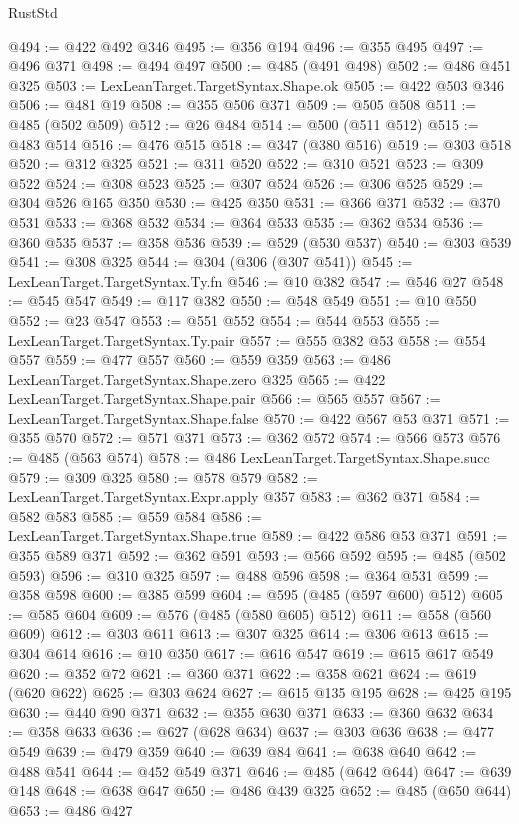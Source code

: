 \begin{lexlean}{RustStd}
\begin{coremodule}
@494 := @422 @492 @346
@495 := @356 @194
@496 := @355 @495
@497 := @496 @371
@498 := @494 @497
@500 := @485 (@491 @498)
@502 := @486 @451 @325
@503 := LexLeanTarget.TargetSyntax.Shape.ok
@505 := @422 @503 @346
@506 := @481 @19
@508 := @355 @506 @371
@509 := @505 @508
@511 := @485 (@502 @509)
@512 := @26 @484
@514 := @500 (@511 @512)
@515 := @483 @514
@516 := @476 @515
@518 := @347 (@380 @516)
@519 := @303 @518
@520 := @312 @325
@521 := @311 @520
@522 := @310 @521
@523 := @309 @522
@524 := @308 @523
@525 := @307 @524
@526 := @306 @525
@529 := @304 @526 @165 @350
@530 := @425 @350
@531 := @366 @371
@532 := @370 @531
@533 := @368 @532
@534 := @364 @533
@535 := @362 @534
@536 := @360 @535
@537 := @358 @536
@539 := @529 (@530 @537)
@540 := @303 @539
@541 := @308 @325
@544 := @304 (@306 (@307 @541))
@545 := LexLeanTarget.TargetSyntax.Ty.fn
@546 := @10 @382
@547 := @546 @27
@548 := @545 @547
@549 := @117 @382
@550 := @548 @549
@551 := @10 @550
@552 := @23 @547
@553 := @551 @552
@554 := @544 @553
@555 := LexLeanTarget.TargetSyntax.Ty.pair
@557 := @555 @382 @53
@558 := @554 @557
@559 := @477 @557
@560 := @559 @359
@563 := @486 LexLeanTarget.TargetSyntax.Shape.zero @325
@565 := @422 LexLeanTarget.TargetSyntax.Shape.pair
@566 := @565 @557
@567 := LexLeanTarget.TargetSyntax.Shape.false
@570 := @422 @567 @53 @371
@571 := @355 @570
@572 := @571 @371
@573 := @362 @572
@574 := @566 @573
@576 := @485 (@563 @574)
@578 := @486 LexLeanTarget.TargetSyntax.Shape.succ
@579 := @309 @325
@580 := @578 @579
@582 := LexLeanTarget.TargetSyntax.Expr.apply @357
@583 := @362 @371
@584 := @582 @583
@585 := @559 @584
@586 := LexLeanTarget.TargetSyntax.Shape.true
@589 := @422 @586 @53 @371
@591 := @355 @589 @371
@592 := @362 @591
@593 := @566 @592
@595 := @485 (@502 @593)
@596 := @310 @325
@597 := @488 @596
@598 := @364 @531
@599 := @358 @598
@600 := @385 @599
@604 := @595 (@485 (@597 @600) @512)
@605 := @585 @604
@609 := @576 (@485 (@580 @605) @512)
@611 := @558 (@560 @609)
@612 := @303 @611
@613 := @307 @325
@614 := @306 @613
@615 := @304 @614
@616 := @10 @350
@617 := @616 @547
@619 := @615 @617 @549
@620 := @352 @72
@621 := @360 @371
@622 := @358 @621
@624 := @619 (@620 @622)
@625 := @303 @624
@627 := @615 @135 @195
@628 := @425 @195
@630 := @440 @90 @371
@632 := @355 @630 @371
@633 := @360 @632
@634 := @358 @633
@636 := @627 (@628 @634)
@637 := @303 @636
@638 := @477 @549
@639 := @479 @359
@640 := @639 @84
@641 := @638 @640
@642 := @488 @541
@644 := @452 @549 @371
@646 := @485 (@642 @644)
@647 := @639 @148
@648 := @638 @647
@650 := @486 @439 @325
@652 := @485 (@650 @644)
@653 := @486 @427

\end{coremodule}
\end{lexlean}
